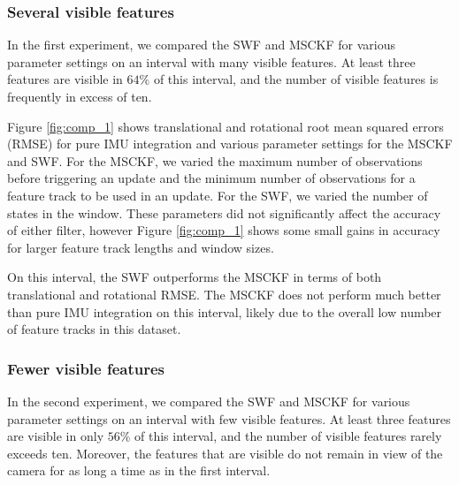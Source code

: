 \documentclass[letterpaper, 10 pt, conference]{ieeeconf}  %
\begin{document}
\subsubsection{Several visible features}
In the first experiment, we compared the SWF and MSCKF for various parameter settings on an interval with many visible features.
At least three features are visible in $64\%$ of this interval, and the number of visible features is frequently in excess of ten.


Figure \ref{fig:comp_1} shows translational and rotational root mean squared errors (RMSE) for pure IMU integration and various parameter settings for the MSCKF and SWF.
For the MSCKF, we varied the maximum number of observations before triggering an update and the minimum number of observations for a feature track to be used in an update.
For the SWF, we varied the number of states in the window.
These parameters did not significantly affect the accuracy of either filter, however Figure \ref{fig:comp_1} shows some small gains in accuracy for larger feature track lengths and window sizes.

On this interval, the SWF outperforms the MSCKF in terms of both translational and rotational RMSE.
The MSCKF does not perform much better than pure IMU integration on this interval, likely due to the overall low number of feature tracks in this dataset.

\subsubsection{Fewer visible features}
In the second experiment, we compared the SWF and MSCKF for various parameter settings on an interval with few visible features.
At least three features are visible in only $56\%$ of this interval, and the number of visible features rarely exceeds ten.
Moreover, the features that are visible do not remain in view of the camera for as long a time as in the first interval.
\end{document}
